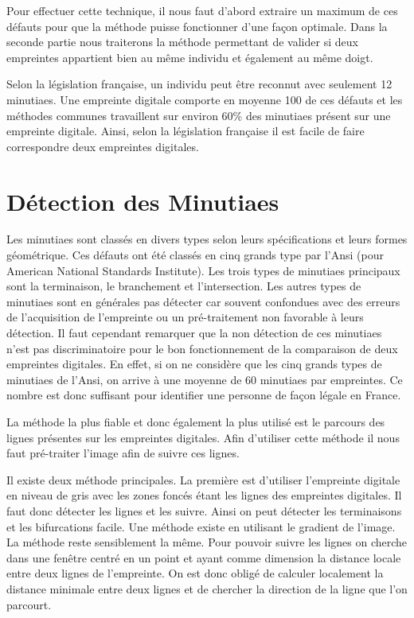 \documentclass{report}
\begin{document}
Pour effectuer cette technique, il nous faut d'abord extraire un
maximum de ces défauts pour que la méthode puisse fonctionner d'une
façon optimale. Dans la seconde partie nous traiterons la méthode
permettant de valider si deux empreintes appartient bien au même
individu et également au même doigt.

Selon la législation française, un individu peut être reconnut avec
seulement 12 minutiaes. Une empreinte digitale comporte en moyenne 100
de ces défauts et les méthodes communes travaillent sur environ 60\%
des minutiaes présent sur une empreinte digitale. Ainsi, selon la
législation française il est facile de faire correspondre deux
empreintes digitales.


\section{Détection des Minutiaes}

Les minutiaes sont classés en divers types selon leurs spécifications
et leurs formes géométrique. Ces défauts ont été classés en cinq
grands type par l'Ansi (pour American National Standards
Institute). Les trois types de minutiaes principaux sont la
terminaison, le branchement et l'intersection. Les autres types de
minutiaes sont en générales pas détecter car souvent confondues avec
des erreurs de l'acquisition de l'empreinte ou un pré-traitement non
favorable à leurs détection. Il faut cependant remarquer que la non
détection de ces minutiaes n'est pas discriminatoire pour le bon
fonctionnement de la comparaison de deux empreintes digitales. En
effet, si on ne considère que les cinq grands types de minutiaes de
l'Ansi, on arrive à une moyenne de 60 minutiaes par empreintes. Ce
nombre est donc suffisant pour identifier une personne de façon légale
en France.

La méthode la plus fiable et donc également la plus utilisé est le
parcours des lignes présentes sur les empreintes digitales. Afin
d'utiliser cette méthode il nous faut pré-traiter l'image afin de
suivre ces lignes.

Il existe deux méthode principales. La première est d'utiliser
l'empreinte digitale en niveau de gris avec les zones foncés étant les
lignes des empreintes digitales. Il faut donc détecter les lignes et
les suivre. Ainsi on peut détecter les terminaisons et les
bifurcations facile. Une méthode existe en utilisant le gradient de
l'image. La méthode reste sensiblement la même. Pour pouvoir suivre
les lignes on cherche dans une fenêtre centré en un point et ayant
comme dimension la distance locale entre deux lignes de
l'empreinte. On est donc obligé de calculer localement la distance
minimale entre deux lignes et  de chercher la direction de la ligne
que l'on parcourt.
\end{document}
